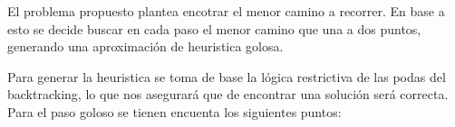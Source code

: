 



El problema propuesto plantea encotrar el menor camino a recorrer. En base a esto se decide buscar en cada paso el menor camino que una a dos puntos, generando una aproximación de heuristica golosa.

Para generar la heuristica se toma de base la lógica restrictiva de las podas del backtracking, lo que nos asegurará que de encontrar una solución será correcta. Para el paso goloso se tienen encuenta los siguientes puntos:

